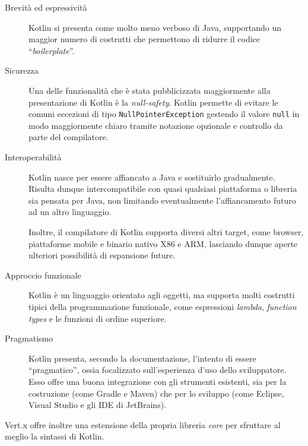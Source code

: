         \begin{description}
          \item[Brevità ed espressività]
            Kotlin si presenta come molto meno verboso di Java, supportando un maggior numero di costrutti che permettono di ridurre il codice ``\emph{boilerplate}''.

          \item[Sicurezza]
            Una delle funzionalità che è stata pubblicizzata maggiormente alla presentazione di Kotlin è la \emph{null-safety}.
            Kotlin permette di evitare le comuni eccezioni di tipo \texttt{NullPointerException} gestendo il valore \texttt{null} in modo maggiormente chiaro tramite notazione opzionale e controllo da parte del compilatore.

          \item[Interoperabilità]
            Kotlin nasce per essere affiancato a Java e sostituirlo gradualmente.
            Risulta dunque intercompatibile con quasi qualsiasi piattaforma o libreria sia pensata per Java, non limitando eventualmente l'affiancamento futuro ad un altro linguaggio.

            Inoltre, il compilatore di Kotlin supporta diversi altri target, come browser, piattaforme mobile e binario nativo X86 e ARM, lasciando dunque aperte ulteriori possibilità di espansione future.

          \item[Approccio funzionale]
            Kotlin è un linguaggio orientato agli oggetti, ma supporta molti costrutti tipici della programmazione funzionale, come espressioni \emph{lambda}, \emph{function types} e le funzioni di ordine superiore.


          \item[Pragmatismo]
            Kotlin presenta, secondo la documentazione, l'intento di essere ``pragmatico'', ossia focalizzato sull'esperienza d'uso dello sviluppatore.
            Esso offre una buona integrazione con gli strumenti esistenti, sia per la costruzione (come Gradle e Maven) che per lo sviluppo (come Eclipse, Visual Studio e gli IDE di JetBrains).
        \end{description}

        Vert.x offre inoltre una estensione della propria libreria \emph{core} per sfruttare al meglio la sintassi di Kotlin.

